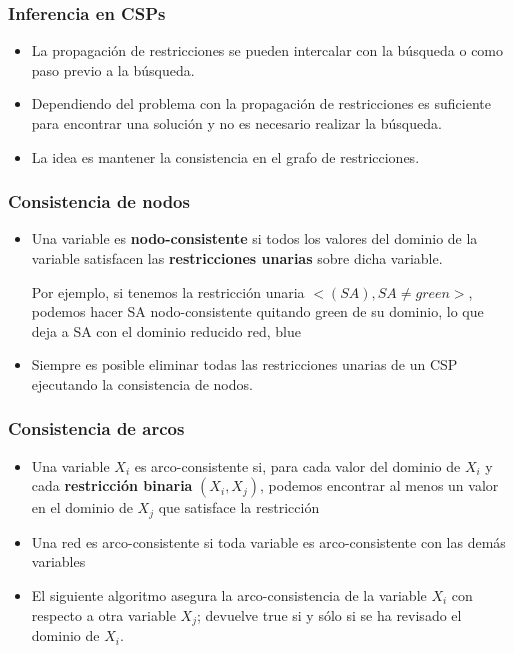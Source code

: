 \documentclass{beamer}
\begin{document}

\begin{frame}  \frametitle{Inferencia en CSPs} \small

\begin{itemize}
\item La propagación de restricciones se pueden intercalar con la búsqueda o como paso previo a la búsqueda.

\item Dependiendo del problema con la propagación de restricciones es suficiente para encontrar una solución y no es necesario realizar la búsqueda.
\item La idea es mantener la consistencia en el grafo de restricciones.

\end{itemize}

\end{frame} 


\begin{frame}  \frametitle{Consistencia de nodos} \small

\begin{itemize}
\item Una variable es \textbf{nodo-consistente} si todos los valores del dominio de la variable satisfacen las \textbf{restricciones unarias} sobre dicha variable.

Por ejemplo, si tenemos la restricción unaria $<(SA),SA \neq green>$, podemos hacer SA nodo-consistente quitando green de su dominio, lo que deja a SA con el dominio reducido {red, blue}

\item Siempre es posible eliminar todas las restricciones unarias de un CSP ejecutando la consistencia de nodos.

\end{itemize}

\end{frame} 


\begin{frame}  \frametitle{Consistencia de arcos} \small

\begin{itemize}
\item Una variable $X_i$ es arco-consistente si, para cada valor del dominio de $X_i$ y cada \textbf{restricción binaria} $(X_i,X_j)$, podemos encontrar al menos un valor en el dominio de $X_j$ que satisface la restricción

\item Una red es arco-consistente si toda variable es arco-consistente con las demás variables

\item El siguiente algoritmo asegura la arco-consistencia de la variable $X_i$ con respecto a otra variable $X_j$; devuelve true si y sólo si se ha revisado el dominio de $X_i$.

\end{itemize}

\end{frame} 
\end{document}
